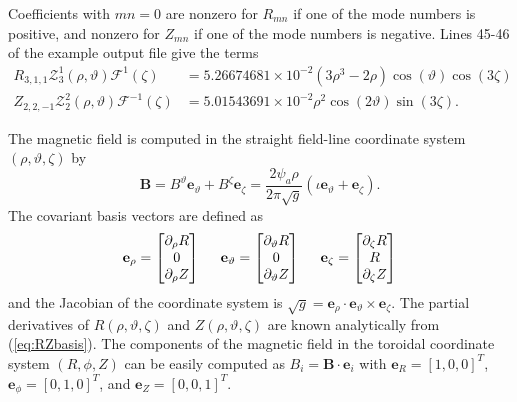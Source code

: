 \documentclass[10pt,a4paper]{article}
\newcommand{\er}{{\mathbf e}_{\rho}}
\newcommand{\ev}{{\mathbf e}_{\vartheta}}
\newcommand{\ez}{{\mathbf e}_{\zeta}}
\newcommand{\eR}{{\mathbf e}_{R}}
\newcommand{\eP}{{\mathbf e}_{\phi}}
\newcommand{\eZ}{{\mathbf e}_{Z}}
\begin{document}
Coefficients with $mn = 0$ are nonzero for $R_{mn}$ if one of the mode numbers is positive, and nonzero for $Z_{mn}$ if one of the mode numbers is negative.  
Lines 45-46 of the example output file give the terms 
%
\begin{subequations}
\begin{align*}
R_{3,1,1} \mathcal{Z}^{1}_{3}(\rho,\vartheta) \mathcal{F}^{1}(\zeta) &= 5.26674681 \times 10^{-2} (3\rho^3-2\rho) \cos(\vartheta) \cos(3\zeta) \\
Z_{2,2,-1} \mathcal{Z}^{2}_{2}(\rho,\vartheta) \mathcal{F}^{-1}(\zeta) &= 5.01543691 \times 10^{-2} \rho^2 \cos(2\vartheta) \sin(3\zeta).
\end{align*}
\end{subequations}

The magnetic field is computed in the straight field-line coordinate system $(\rho,\vartheta,\zeta)$ by 
%
\begin{equation}
\mathbf{B} = B^\vartheta \ev + B^\zeta \ez = \frac{2\psi_a \rho}{2\pi \sqrt{g}} \left( \iota \ev + \ez \right).
\end{equation}
%
The covariant basis vectors are defined as 
\begin{equation}
\er = \begin{bmatrix} \partial_\rho R \\ 0 \\ \partial_\rho Z \end{bmatrix} \hspace{5mm} \ev = \begin{bmatrix} \partial_\vartheta R \\ 0 \\ \partial_\vartheta Z \end{bmatrix} \hspace{5mm} \ez = \begin{bmatrix} \partial_\zeta R \\ R \\ \partial_\zeta Z \end{bmatrix}
\end{equation}
%
and the Jacobian of the coordinate system is $\sqrt{g} = \er\cdot\ev\times\ez$.  
The partial derivatives of $R(\rho,\vartheta,\zeta)$ and $Z(\rho,\vartheta,\zeta)$ are known analytically from (\ref{eq:RZbasis}).  
The components of the magnetic field in the toroidal coordinate system $(R,\phi,Z)$ can be easily computed as $B_i = \mathbf{B} \cdot \mathbf{e}_i$ with $\eR = [1, 0, 0]^T$, $\eP = [0, 1, 0]^T$, and $\eZ = [0, 0, 1]^T$.  
\end{document}
